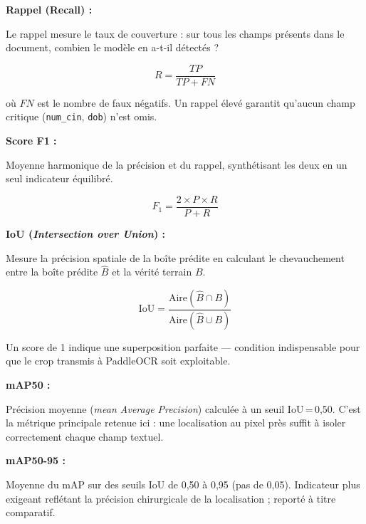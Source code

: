 \begin{tcolorbox}
\medskip

\noindent\textcolor{bleu_clair}{}\; \textcolor{bleu_clair}{\textbf{Rappel (Recall) :}}

\noindent Le rappel mesure le taux de couverture : sur tous les champs présents dans le document, combien le modèle en a-t-il détectés ?

\begin{equation*}
  R = \frac{TP}{TP + FN}
\end{equation*}

\noindent où $FN$ est le nombre de faux négatifs. Un rappel élevé garantit qu'aucun champ critique (\texttt{num\_cin}, \texttt{dob}) n'est omis.

\medskip

\noindent\textcolor{bleu_clair}{}\; \textcolor{bleu_clair}{\textbf{Score F1 :}}

\noindent Moyenne harmonique de la précision et du rappel, synthétisant les deux en un seul indicateur équilibré.

\begin{equation*}
  F_1 = \frac{2 \times P \times R}{P + R}
\end{equation*}

\medskip

\noindent\textcolor{bleu_clair}{}\; \textcolor{bleu_clair}{\textbf{IoU (\textit{Intersection over Union}) :}}

\noindent Mesure la précision spatiale de la boîte prédite en calculant le chevauchement entre la boîte prédite $\hat{B}$ et la vérité terrain $B$.

\begin{equation*}
  \text{IoU} = \frac{\text{Aire}(\hat{B} \cap B)}{\text{Aire}(\hat{B} \cup B)}
\end{equation*}

\noindent Un score de 1 indique une superposition parfaite — condition indispensable pour que le crop transmis à PaddleOCR soit exploitable.

\medskip

\noindent\textcolor{bleu_clair}{}\; \textcolor{bleu_clair}{\textbf{mAP50 :}}

\noindent Précision moyenne (\textit{mean Average Precision}) calculée à un seuil IoU\,=\,0,50. C'est la métrique principale retenue ici : une localisation au pixel près suffit à isoler correctement chaque champ textuel.

\medskip

\noindent\textcolor{bleu_clair}{}\; \textcolor{bleu_clair}{\textbf{mAP50-95 :}}

\noindent Moyenne du mAP sur des seuils IoU de 0,50 à 0,95 (pas de 0,05). Indicateur plus exigeant reflétant la précision chirurgicale de la localisation ; reporté à titre comparatif.

\end{tcolorbox}

